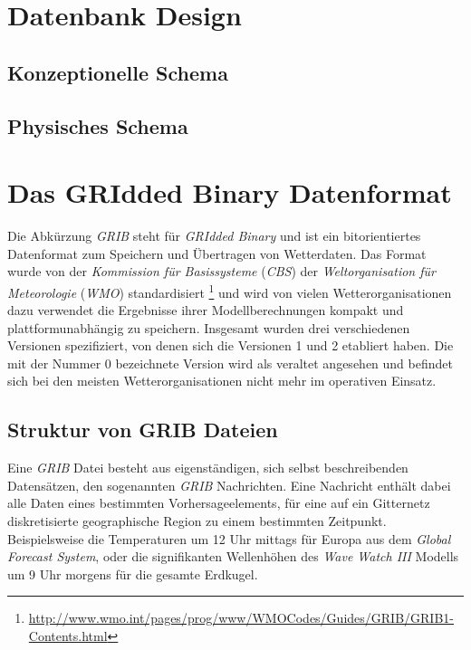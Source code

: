 \section{Datenbank Design}
\subsection{Konzeptionelle Schema}
\subsection{Physisches Schema}

\section{Das GRIdded Binary Datenformat}

Die Abkürzung \textit{GRIB}  steht
für \textit{GRIdded Binary} und ist ein bitorientiertes Datenformat
zum Speichern und Übertragen von Wetterdaten. Das Format wurde von der
\textit{Kommission für Basissysteme} (\textit{CBS})
 der
\textit{Weltorganisation für Meteorologie} (\textit{WMO})
 standardisiert
\footnote{\url{http://www.wmo.int/pages/prog/www/WMOCodes/Guides/GRIB/GRIB1-Contents.html}}
und wird von vielen Wetterorganisationen dazu verwendet die Ergebnisse
ihrer Modellberechnungen kompakt und plattformunabhängig zu
speichern. Insgesamt wurden drei verschiedenen Versionen spezifiziert,
von denen sich die Versionen 1 und 2 etabliert haben. Die mit der
Nummer 0 bezeichnete Version wird als veraltet angesehen und befindet
sich bei den meisten Wetterorganisationen nicht mehr im operativen
Einsatz.

\subsection{Struktur von GRIB Dateien}

Eine \textit{GRIB} Datei besteht aus eigenständigen, sich selbst
beschreibenden Datensätzen, den sogenannten \textit{GRIB}
Nachrichten. Eine Nachricht enthält dabei alle Daten eines bestimmten
Vorhersageelements, für eine auf ein Gitternetz diskretisierte
geographische Region zu einem bestimmten Zeitpunkt. Beispielsweise die
Temperaturen um 12 Uhr mittags für Europa aus dem \textit{Global
  Forecast System}, oder die signifikanten Wellenhöhen des
\textit{Wave Watch III} Modells um 9 Uhr morgens für die gesamte
Erdkugel.

